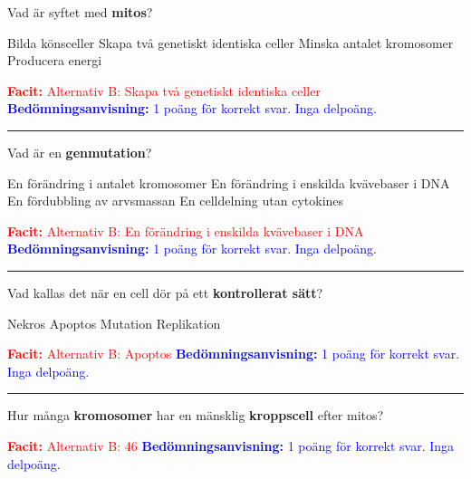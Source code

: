 \documentclass{exam}
\newcommand{\facit}[1]{\textcolor{red}{\textbf{Facit:} #1}}
\newcommand{\bedomning}[1]{\textcolor{blue}{\textbf{Bedömningsanvisning:} #1}}
\begin{document}

\vspace{5mm}
\begin{center}
\end{center}
\vspace{5mm}

\begin{questions}


\question Vad är syftet med \textbf{mitos}?
\begin{checkboxes}
   \choice Bilda könsceller
   \correctchoice Skapa två genetiskt identiska celler
   \choice Minska antalet kromosomer
   \choice Producera energi
\end{checkboxes}
\facit{Alternativ B: Skapa två genetiskt identiska celler}
\bedomning{1 poäng för korrekt svar. Inga delpoäng.}

\vspace{5mm}\hrule\vspace{5mm}

\question Vad är en \textbf{genmutation}?
\begin{checkboxes}
   \choice En förändring i antalet kromosomer
   \correctchoice En förändring i enskilda kvävebaser i DNA
   \choice En fördubbling av arvsmassan
   \choice En celldelning utan cytokines
\end{checkboxes}
\facit{Alternativ B: En förändring i enskilda kvävebaser i DNA}
\bedomning{1 poäng för korrekt svar. Inga delpoäng.}

\vspace{5mm}\hrule\vspace{5mm}

\question Vad kallas det när en cell dör på ett \textbf{kontrollerat sätt}?
\begin{checkboxes}
   \choice Nekros
   \correctchoice Apoptos
   \choice Mutation
   \choice Replikation
\end{checkboxes}
\facit{Alternativ B: Apoptos}
\bedomning{1 poäng för korrekt svar. Inga delpoäng.}

\vspace{5mm}\hrule\vspace{5mm}

\question Hur många \textbf{kromosomer} har en mänsklig \textbf{kroppscell} efter mitos?
\begin{checkboxes}
\end{checkboxes}
\facit{Alternativ B: 46}
\bedomning{1 poäng för korrekt svar. Inga delpoäng.}


\end{questions}
\end{document}
